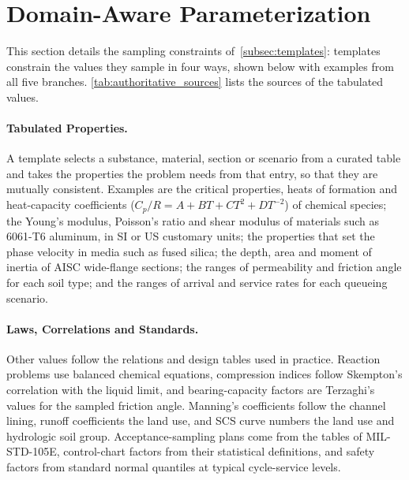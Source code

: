 \section{Domain-Aware Parameterization}
\label{sec:appendix_param_details}

This section details the sampling constraints of~\autoref{subsec:templates}: templates constrain
the values they sample in four ways, shown below with examples from all five branches.
\autoref{tab:authoritative_sources} lists the sources of the tabulated values.

\paragraph{Tabulated Properties.} A template selects a substance, material, section or scenario
from a curated table and takes the properties the problem needs from that entry, so that they are
mutually consistent.
Examples are the critical properties, heats of formation and heat-capacity coefficients
($C_p/R = A + BT + CT^2 + DT^{-2}$) of chemical species; the Young's modulus, Poisson's ratio and
shear modulus of materials such as 6061-T6 aluminum, in SI or US customary units; the properties
that set the phase velocity in media such as fused silica; the depth, area and moment of inertia of
AISC wide-flange sections; the ranges of permeability and friction angle for each soil type; and the
ranges of arrival and service rates for each queueing scenario.

\paragraph{Laws, Correlations and Standards.} Other values follow the relations and design tables
used in practice.
Reaction problems use balanced chemical equations, compression indices follow Skempton's
correlation with the liquid limit, and bearing-capacity factors are Terzaghi's values for the
sampled friction angle.
Manning's coefficients follow the channel lining, runoff coefficients the land use, and SCS curve
numbers the land use and hydrologic soil group.
Acceptance-sampling plans come from the tables of MIL-STD-105E, control-chart factors from their
statistical definitions, and safety factors from standard normal quantiles at typical
cycle-service levels.


